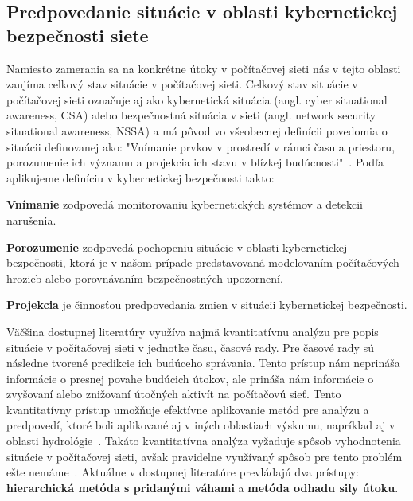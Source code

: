 \documentclass[thesismargins, thesislinespacing, openright, upjsfrontpage, combineabstracts]{rnthesis}
\begin{document}
\subsection{Predpovedanie situácie v oblasti kybernetickej bezpečnosti siete} \label{forecast}

Namiesto zamerania sa na konkrétne útoky v počítačovej sieti nás v tejto oblasti zaujíma celkový stav situácie v počítačovej sieti. Celkový stav situácie v počítačovej sieti označuje aj ako kybernetická situácia (angl. cyber situational awareness, CSA) alebo bezpečnostná situácia v sieti (angl. network security situational awareness, NSSA) a má pôvod vo všeobecnej definícii povedomia o situácii definovanej ako:
"Vnímanie prvkov v prostredí v rámci času a priestoru, porozumenie ich významu a projekcia ich stavu v blízkej budúcnosti"~\cite{Endsley1988}. Podľa \cite{Yang2014} aplikujeme definíciu v kybernetickej bezpečnosti takto: 

\begin{compactenum}
    \item \textbf{Vnímanie} zodpovedá monitorovaniu kybernetických systémov a detekcii narušenia.
    \item \textbf{Porozumenie} zodpovedá pochopeniu situácie v oblasti kybernetickej bezpečnosti, ktorá je v našom prípade predstavovaná modelovaním počítačových hrozieb alebo porovnávaním bezpečnostných upozornení. 
    \item \textbf{Projekcia} je činnosťou predpovedania zmien v situácii kybernetickej bezpečnosti. 
\end{compactenum}

Väčšina dostupnej literatúry využíva najmä kvantitatívnu analýzu pre popis situácie v počítačovej sieti v jednotke času, časové rady. Pre časové rady sú následne tvorené predikcie ich budúceho správania. Tento prístup nám neprináša informácie o presnej povahe budúcich útokov, ale prináša nám informácie o zvyšovaní alebo znižovaní útočných aktivít na počítačovú sieť. Tento kvantitatívny prístup umožňuje efektívne aplikovanie metód pre analýzu a predpovedí, ktoré boli aplikované aj v iných oblastiach výskumu, napríklad aj v oblasti hydrológie~\cite{wang2009comparison}. Takáto kvantitatívna analýza vyžaduje spôsob vyhodnotenia situácie v počítačovej sieti, avšak pravidelne využívaný spôsob pre tento problém ešte nemáme~\cite{husak2020preprint}. Aktuálne v dostupnej literatúre prevládajú dva prístupy: \textbf{hierarchická metóda s pridanými váhami} a \textbf{metóda odhadu sily útoku}. 
\end{document}
